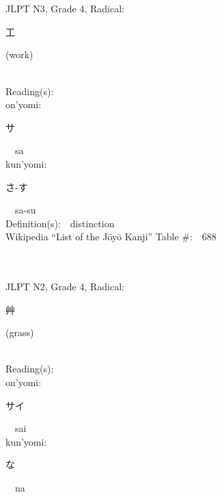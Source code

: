 \begin{multicols}{2}
\ \ \\
{\fontsize{34pt}{40pt}  }\ \ \\  %
{JLPT N3, Grade 4, Radical:\ \ {\begin{CJK}{UTF8}{min} 工 \end{CJK}} (work) } \\
Reading(s):\ \ \\
{\hspace*{1em}}on'yomi:\ \ \\
{\hspace*{2em}}{\begin{CJK}{UTF8}{min} サ \end{CJK}}\ \ sa\ \ \\
{\hspace*{1em}}kun'yomi:\ \ \\
{\hspace*{2em}}{\begin{CJK}{UTF8}{min} さ-す \end{CJK}}\ \ sa-su\ \ \\
Definition(s):\ \ distinction \\
Wikipedia ``List of the J\=oy\=o Kanji'' Table \#:\ \ 688 \\
\ \ \\
{\fontsize{34pt}{40pt}  }\ \ \\  %
{JLPT N2, Grade 4, Radical:\ \ {\begin{CJK}{UTF8}{min} 艸 \end{CJK}} (grass) } \\
Reading(s):\ \ \\
{\hspace*{1em}}on'yomi:\ \ \\
{\hspace*{2em}}{\begin{CJK}{UTF8}{min} サイ \end{CJK}}\ \ sai\ \ \\
{\hspace*{1em}}kun'yomi:\ \ \\
{\hspace*{2em}}{\begin{CJK}{UTF8}{min} な \end{CJK}}\ \ na\ \ \\

\end{multicols}
